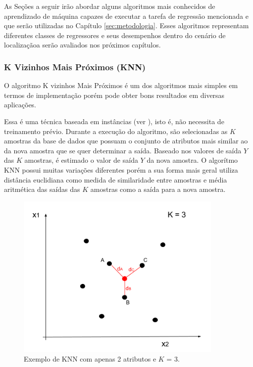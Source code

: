 \documentclass[12pt]{article}
\begin{document}
        As Seções a seguir irão abordar alguns algoritmos mais conhecidos de aprendizado de máquina capazes de executar a tarefa de regressão mencionada e que serão utilizadas no Capítulo \ref{sec:metodologia}. Esses algoritmos representam diferentes classes de regressores e seus desempenhos dentro do cenário de localizaçãoa serão avaliados nos próximos capítulos. 
        
            \subsubsection{K Vizinhos Mais Próximos (KNN)}
            \label{sec:KNN}

            O algoritmo K vizinhos Mais Próximos é um dos algoritmos mais simples em termos de implementação porém pode obter bons resultados em diversas aplicações.
            
            Essa é uma técnica baseada em instâncias (ver \cite{instanceBasedLearning1991}), isto é, não necessita de treinamento prévio. Durante a execução do algoritmo, são selecionadas as $K$ amostras da base de dados que possuam o conjunto de atributos mais similar ao da nova amostra que se quer determinar a saída. Baseado nos valores de saída $Y$ das $K$ amostras, é estimado o valor de saída $Y$ da nova amostra.
            O algorítmo KNN possui muitas variações diferentes porém a sua forma mais geral utiliza distância euclidiana como medida de similaridade entre amostras e média aritmética das saídas das $K$ amostras como a saída para a nova amostra.
            
            \begin{figure}[H]
            \centering
            \includegraphics[width=10cm]{images/KNN.png}\par
            \caption{Exemplo de KNN com apenas 2 atributos e $K$ = 3.}
            \label{fig:exemploKNN}
            \end{figure}
            
\end{document}
